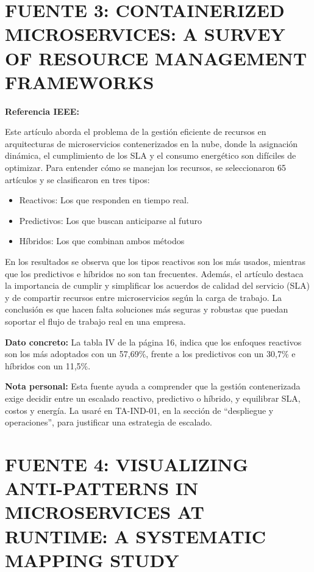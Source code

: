 \documentclass[12pt,a4paper]{article}
\begin{document}
\section*{FUENTE 3: CONTAINERIZED MICROSERVICES: A SURVEY OF RESOURCE MANAGEMENT FRAMEWORKS}

\textbf{Referencia IEEE:} 

Este artículo aborda el problema de la gestión eficiente de recursos en arquitecturas de microservicios contenerizados en la nube, donde la asignación dinámica, el cumplimiento de los SLA y el consumo energético son difíciles de optimizar. Para entender cómo se manejan los recursos, se seleccionaron 65 artículos y se clasificaron en tres tipos:

\begin{itemize}
    \item Reactivos: Los que responden en tiempo real.
    \item Predictivos: Los que buscan anticiparse al futuro
    \item Híbridos: Los que combinan ambos métodos
\end{itemize}

En los resultados se observa que los tipos reactivos son los más usados, mientras que los predictivos e híbridos no son tan frecuentes. Además, el artículo destaca la importancia de cumplir y simplificar los acuerdos de calidad del servicio (SLA) y de compartir recursos entre microservicios según la carga de trabajo. La conclusión es que hacen falta soluciones más seguras y robustas que puedan soportar el flujo de trabajo real en una empresa.

\textbf{Dato concreto:} La tabla IV de la página 16, indica que los enfoques reactivos son los más adoptados con un 57,69\%, frente a los predictivos con un 30,7\% e híbridos con un 11,5\%.

\textbf{Nota personal:} Esta fuente ayuda a comprender que la gestión contenerizada exige decidir entre un escalado reactivo, predictivo o híbrido, y equilibrar SLA, costos y energía. La usaré en TA-IND-01, en la sección de ``despliegue y operaciones'', para justificar una estrategia de escalado.

\section*{FUENTE 4: VISUALIZING ANTI-PATTERNS IN MICROSERVICES AT RUNTIME: A SYSTEMATIC MAPPING STUDY}
\end{document}
